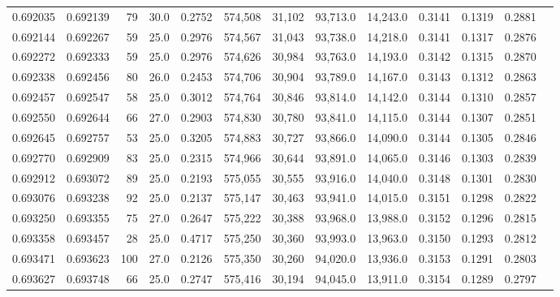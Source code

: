 \begin{tabular}{rrrrrrrrrrrrr}
0.692035 & 0.692139 &    79 & 30.0 &                                     0.2752 & 574,508 &  31,102 &  93,713.0 &  14,243.0 & 0.3141 & 0.1319 & 0.2881 \\
0.692144 & 0.692267 &    59 & 25.0 &                                     0.2976 & 574,567 &  31,043 &  93,738.0 &  14,218.0 & 0.3141 & 0.1317 & 0.2876 \\
0.692272 & 0.692333 &    59 & 25.0 &                                     0.2976 & 574,626 &  30,984 &  93,763.0 &  14,193.0 & 0.3142 & 0.1315 & 0.2870 \\
0.692338 & 0.692456 &    80 & 26.0 &                                     0.2453 & 574,706 &  30,904 &  93,789.0 &  14,167.0 & 0.3143 & 0.1312 & 0.2863 \\
0.692457 & 0.692547 &    58 & 25.0 &                                     0.3012 & 574,764 &  30,846 &  93,814.0 &  14,142.0 & 0.3144 & 0.1310 & 0.2857 \\
0.692550 & 0.692644 &    66 & 27.0 &                                     0.2903 & 574,830 &  30,780 &  93,841.0 &  14,115.0 & 0.3144 & 0.1307 & 0.2851 \\
0.692645 & 0.692757 &    53 & 25.0 &                                     0.3205 & 574,883 &  30,727 &  93,866.0 &  14,090.0 & 0.3144 & 0.1305 & 0.2846 \\
0.692770 & 0.692909 &    83 & 25.0 &                                     0.2315 & 574,966 &  30,644 &  93,891.0 &  14,065.0 & 0.3146 & 0.1303 & 0.2839 \\
0.692912 & 0.693072 &    89 & 25.0 &                                     0.2193 & 575,055 &  30,555 &  93,916.0 &  14,040.0 & 0.3148 & 0.1301 & 0.2830 \\
0.693076 & 0.693238 &    92 & 25.0 &                                     0.2137 & 575,147 &  30,463 &  93,941.0 &  14,015.0 & 0.3151 & 0.1298 & 0.2822 \\
0.693250 & 0.693355 &    75 & 27.0 &                                     0.2647 & 575,222 &  30,388 &  93,968.0 &  13,988.0 & 0.3152 & 0.1296 & 0.2815 \\
0.693358 & 0.693457 &    28 & 25.0 &                                     0.4717 & 575,250 &  30,360 &  93,993.0 &  13,963.0 & 0.3150 & 0.1293 & 0.2812 \\
0.693471 & 0.693623 &   100 & 27.0 &                                     0.2126 & 575,350 &  30,260 &  94,020.0 &  13,936.0 & 0.3153 & 0.1291 & 0.2803 \\
0.693627 & 0.693748 &    66 & 25.0 &                                     0.2747 & 575,416 &  30,194 &  94,045.0 &  13,911.0 & 0.3154 & 0.1289 & 0.2797 \\

\end{tabular}
